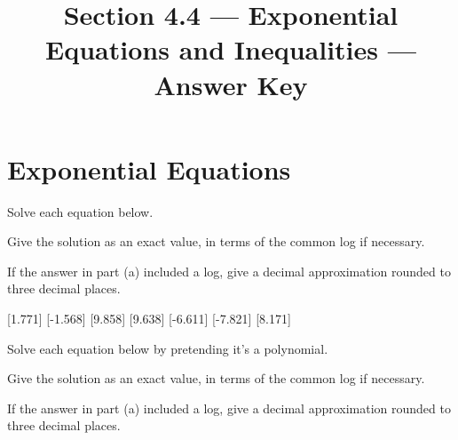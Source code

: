 

\newcommand{\includeeq}[1]{%
\ifthenelse{\equal{#1}{>}}{\geq}{%
\ifthenelse{\equal{#1}{<}}{\leq}#1}}

\title{Section 4.4 --- Exponential Equations and Inequalities --- Answer Key}


\maketitle

\section*{Exponential Equations}
Solve each equation below.
\begin{clist}
\item Give the solution as an exact value, in terms of the common log if necessary.
\item If the answer in part (a) included a log, give a decimal approximation rounded to three decimal places.
\end{clist}
\begin{smenum}
\mitemxxxx
{[1.771]}
{}
{[-1.568]}
{[9.858]}
\mitemxx
{[9.638]}
{[-6.611]}
\mitemxx
{[-7.821]}
{[8.171]}
\end{smenum}
Solve each equation below by pretending it's a polynomial.
\begin{clist}
\item Give the solution as an exact value, in terms of the common log if necessary.
\item If the answer in part (a) included a log, give a decimal approximation rounded to three decimal places.
\end{clist}
\begin{smenum}
\mitemxx
{}
{}
\mitemxx
{}
{}
\end{smenum}


